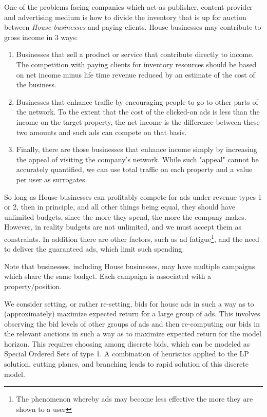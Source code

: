 \documentclass[finalversion,simpleeqnnos]{yrl}
\begin{document}
One of the problems facing companies which act as publisher, content provider and advertising medium is how to divide the inventory that is up for auction between {\em House businesses} and paying clients.  House businesses may contribute to gross income in 3 ways:
\begin{enumerate}
\item	Businesses that sell a product or service that contribute directly to income.  The competition with paying clients for inventory resources should be based on net income minus life time revenue reduced by an estimate of the cost of the business.  
\item	Businesses that enhance traffic by encouraging people to go to other parts of the network.  To the extent that the cost of the clicked-on ads is less than the income on the target property, the net income is the difference between these two amounts and such ads can compete on that basis.  
\item	Finally, there are those businesses that enhance income simply by increasing the appeal of visiting the company's network.  While such "appeal" cannot be accurately quantified, we can use total traffic on each property and a value per user as surrogates.
\end{enumerate}
So long as House businesses can profitably compete for ads under revenue types 1 or 2, then in principle, and all other things being equal, they should have unlimited budgets, since the more they spend, the more the company makes. However, in reality budgets are not unlimited, and we must accept them as constraints. In addition there are other factors, such as ad fatigue\footnote{The phenomenon whereby ads may become less effective the more they are shown to a user}, and the need to deliver the guaranteed ads, which limit such spending.

Note that businesses, including House businesses, may have multiple campaigns which share the same badget. Each campaign is associated with a property/position.

We consider setting, or rather re-setting, bids for house ads in such a way as to (approximately) maximize expected return for a large group of ads. This involves observing the bid levels of other groups of ads and then re-computing our bids in the relevant auctions in such a way as to maximize expected return for the model horizon. This requires choosing among discrete bids, which can be modeled as Special Ordered Sets\cite{SOS} of type 1. A combination of heuristics applied to the LP solution, cutting planes, and branching leads to rapid solution of this discrete model.
 
\end{document}
